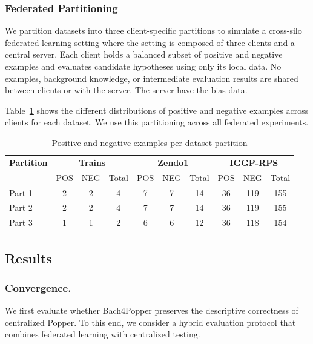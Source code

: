 \subsubsection{Federated Partitioning}
\label{sec:federated-partitioning}

We partition datasets into three client-specific partitions to simulate a cross-silo federated learning setting where the setting is composed of three clients and a central server. Each client holds a balanced subset of positive and negative examples and evaluates candidate hypotheses using only its local data. No examples, background knowledge, or intermediate evaluation results are shared between clients or with the server. The server have the bias data. 

Table~\ref{tab:fed-partitions} shows the different distributions of positive and negative examples across clients for each dataset. We use this partitioning across all federated experiments. 

\begin{table}[ht]
\centering
\caption{Positive and negative examples per dataset partition}
\label{tab:fed-partitions}
\setlength{\tabcolsep}{6pt}
\begin{tabular}{l|ccc|ccc|ccc}
\toprule
\textbf{Partition}
& \multicolumn{3}{c|}{\textbf{Trains}}
& \multicolumn{3}{c|}{\textbf{Zendo1}}
& \multicolumn{3}{c}{\textbf{IGGP-RPS}} \\
& POS & NEG & Total
& POS & NEG & Total
& POS & NEG & Total \\
\midrule

Part 1
& 2 & 2 & 4
& 7 & 7 & 14
& 36 & 119 & 155 \\

Part 2
& 2 & 2 & 4
& 7 & 7 & 14
& 36 & 119 & 155 \\

Part 3
& 1 & 1 & 2
& 6 & 6 & 12
& 36 & 118 & 154 \\

\bottomrule
\end{tabular}
\end{table}


\subsection{Results}


\subsubsection{Convergence.}
We first evaluate whether Bach4Popper preserves the descriptive correctness of centralized Popper.
To this end, we consider a hybrid evaluation protocol that combines federated learning with centralized testing.

